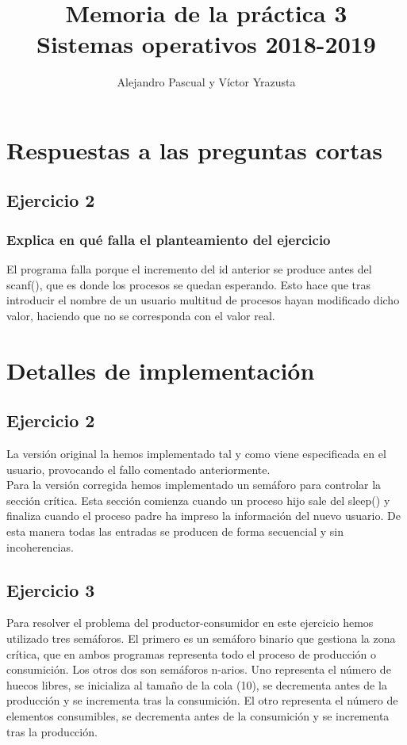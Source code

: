 \documentclass[]{article}
\title{Memoria de la práctica 3\\
	\Large Sistemas operativos 2018-2019}
\author{Alejandro Pascual y V\'ictor Yrazusta}
\begin{document}
\maketitle

\section*{Respuestas a las preguntas cortas}
\subsection*{Ejercicio 2}
\subsubsection*{Explica en qué falla el planteamiento del ejercicio}
El programa falla porque el incremento del id anterior se produce antes del scanf(), que es donde los procesos se quedan esperando. Esto hace que tras introducir el nombre de un usuario multitud de procesos hayan modificado dicho valor, haciendo que no se corresponda con el valor real. \\

\section*{Detalles de implementación}
\subsection*{Ejercicio 2}
La versión original la hemos implementado tal y como viene especificada en el usuario, provocando el fallo comentado anteriormente. \\

Para la versión corregida hemos implementado un semáforo para controlar la sección crítica. Esta sección comienza cuando un proceso hijo sale del sleep() y finaliza cuando el proceso padre ha impreso la información del nuevo usuario. De esta manera todas las entradas se producen de forma secuencial y sin incoherencias.

\subsection*{Ejercicio 3}
Para resolver el problema del productor-consumidor en este ejercicio hemos utilizado tres semáforos. El primero es un semáforo binario que gestiona la zona crítica, que en ambos programas representa todo el proceso de producción o consumición. Los otros dos son semáforos n-arios. Uno representa el número de huecos libres, se inicializa al tamaño de la cola (10), se decrementa antes de la producción y se incrementa tras la consumición. El otro representa el número de elementos consumibles, se decrementa antes de la consumición y se incrementa tras la producción. \\
\end{document}
